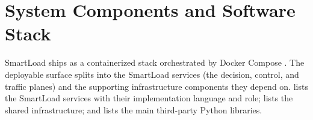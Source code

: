 
\chapter{System Components and Software Stack}
\label{bm:app-stack}

SmartLoad ships as a containerized stack orchestrated by Docker Compose
\cite{merkel2014docker}. The deployable surface splits into the SmartLoad
services (the decision, control, and traffic planes) and the supporting
infrastructure components they depend on.  lists the
SmartLoad services with their implementation language and role;
 lists the shared infrastructure; and
 lists the main third-party Python libraries.

